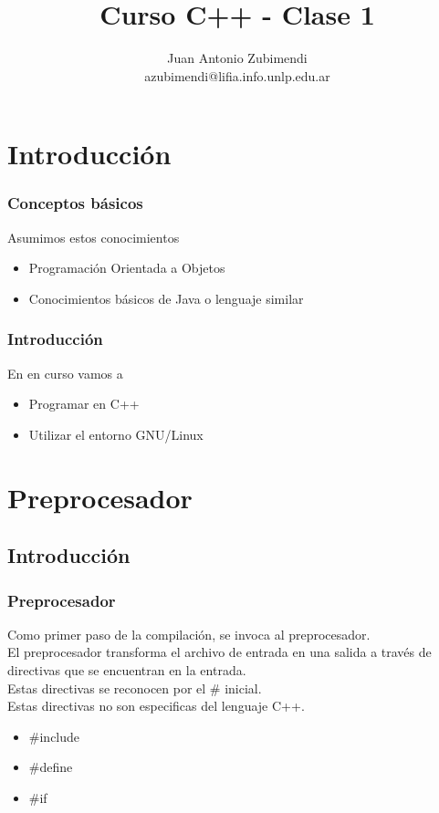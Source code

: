 \documentclass{beamer}
\title{Curso C++ - Clase 1}
\author{Juan Antonio Zubimendi\\azubimendi@lifia.info.unlp.edu.ar}
\institute{LIFIA}
\begin{document}
 
\begin{frame}
\titlepage
\end{frame}

\section{Introducción}

\begin{frame}
\frametitle{Conceptos básicos}
Asumimos estos conocimientos
\begin{itemize}
 \item Programación Orientada a Objetos
 \item Conocimientos básicos de Java o lenguaje similar
\end{itemize}

\end{frame}

\begin{frame}
\frametitle{Introducción}
En en curso vamos a 
\begin{itemize}
 \item Programar en C++
 \item Utilizar el entorno GNU/Linux
\end{itemize}
\end{frame}

\section{Preprocesador}
\subsection{Introducción}
\begin{frame}
\frametitle{Preprocesador}
Como primer paso de la compilación, se invoca al preprocesador. \\
El preprocesador transforma el archivo de entrada en una salida a través de directivas que se encuentran en la entrada. \\
Estas directivas se reconocen por el \# inicial. \\
Estas directivas no son especificas del lenguaje C++. 
\begin{itemize}
 \item \#include
 \item \#define
 \item \#if
\end{itemize}
\end{frame}
\end{document}
